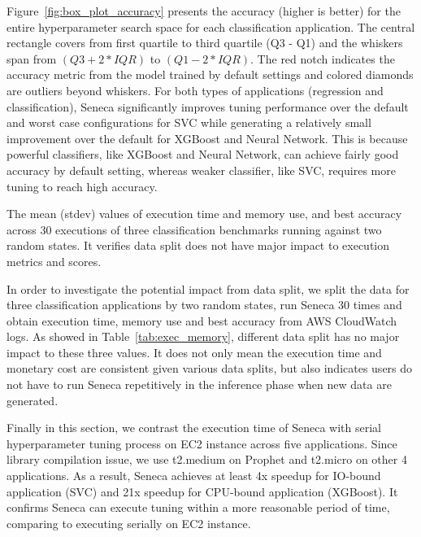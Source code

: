 Figure~\ref{fig:box_plot_accuracy} presents the accuracy (higher is better) 
for the entire hyperparameter search space for each classification
application.  The central rectangle covers from first quartile to third quartile (Q3 - Q1) and the whiskers span from \texttt{$(Q3 + 2 * IQR)$} to \texttt{$(Q1 - 2 * IQR)$}. The red notch indicates the accuracy metric from the model trained by default settings and colored diamonds are outliers beyond whiskers.
For both types of applications (regression and classification), Seneca significantly
improves tuning performance over the default and worst case configurations for SVC while generating a relatively small improvement over the default for XGBoost and Neural Network. This is because powerful classifiers, like XGBoost and Neural Network, can achieve fairly good accuracy by default setting, whereas weaker classifier, like SVC, requires more tuning to reach high accuracy.

\begin{table}[t]
\centering
\scriptsize

\caption{The mean (stdev) values of execution time and memory use, and best accuracy across 30 executions of three classification benchmarks running against two random states. It verifies data split does not have major impact to execution metrics and scores.
\label{tab:exec_memory}}
\end{table}

In order to investigate the potential impact from data split, we split the data for three classification applications by two random states, run Seneca 30 times and obtain execution time, memory use and best accuracy from AWS CloudWatch logs. As showed in Table~\ref{tab:exec_memory}, different data split has no major impact to these three values. It does not only mean the execution time and monetary cost are consistent given various data splits, but also indicates users do not have to run Seneca repetitively in the inference phase when new data are generated.

% 

Finally in this section, we contrast the execution time of Seneca with serial hyperparameter tuning process on EC2 instance across five applications. Since library compilation issue, we use t2.medium on Prophet and t2.micro on other 4 applications. As a result, Seneca achieves at least 4x speedup for IO-bound application (SVC) and 21x speedup for CPU-bound application (XGBoost). It confirms Seneca can execute tuning within a more reasonable period of time, comparing to executing serially on EC2 instance.

